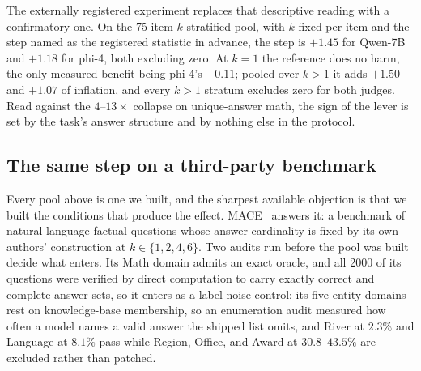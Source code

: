 \documentclass[11pt]{article}
\begin{document}
The externally registered experiment replaces that descriptive reading with a confirmatory one.
On the 75-item $k$-stratified pool, with $k$ fixed per item and the step named as the registered statistic in advance, the step is $+1.45$ for Qwen-7B and $+1.18$ for phi-4, both excluding zero.
At $k{=}1$ the reference does no harm, the only measured benefit being phi-4's $-0.11$; pooled over $k>1$ it adds $+1.50$ and $+1.07$ of inflation, and every $k{>}1$ stratum excludes zero for both judges.
Read against the $4$--$13\times$ collapse on unique-answer math, the sign of the lever is set by the task's answer structure and by nothing else in the protocol.

\subsection{The same step on a third-party benchmark}
\label{sec:mace}

Every pool above is one we built, and the sharpest available objection is that we built the conditions that produce the effect.
\textsc{MACE}~\cite{mace2026} answers it: a benchmark of natural-language factual questions whose answer cardinality is fixed by its own authors' construction at $k \in \{1,2,4,6\}$.
Two audits run before the pool was built decide what enters.
Its Math domain admits an exact oracle, and all 2000 of its questions were verified by direct computation to carry exactly correct and complete answer sets, so it enters as a label-noise control; its five entity domains rest on knowledge-base membership, so an enumeration audit measured how often a model names a valid answer the shipped list omits, and River at $2.3\%$ and Language at $8.1\%$ pass while Region, Office, and Award at $30.8$--$43.5\%$ are excluded rather than patched.
\end{document}
